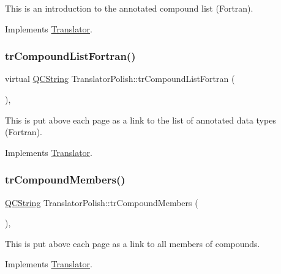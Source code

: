 This is an introduction to the annotated compound list (Fortran). 

Implements \mbox{\hyperlink{class_translator}{Translator}}.

\mbox{\label{class_translator_polish_a7c51709c279dfd97434d2ad5e0dc7ee9}} 
\subsubsection{\texorpdfstring{trCompoundListFortran()}{trCompoundListFortran()}}
{\footnotesize\ttfamily virtual \mbox{\hyperlink{class_q_c_string}{Q\+C\+String}} Translator\+Polish\+::tr\+Compound\+List\+Fortran (\begin{DoxyParamCaption}{ }\end{DoxyParamCaption})\hspace{0.3cm}{\ttfamily [inline]}, {\ttfamily [virtual]}}

This is put above each page as a link to the list of annotated data types (Fortran). 

Implements \mbox{\hyperlink{class_translator}{Translator}}.

\mbox{\label{class_translator_polish_ae99640a160ae514a3bfde7b92802d880}} 
\subsubsection{\texorpdfstring{trCompoundMembers()}{trCompoundMembers()}}
{\footnotesize\ttfamily \mbox{\hyperlink{class_q_c_string}{Q\+C\+String}} Translator\+Polish\+::tr\+Compound\+Members (\begin{DoxyParamCaption}{ }\end{DoxyParamCaption})\hspace{0.3cm}{\ttfamily [inline]}, {\ttfamily [virtual]}}

This is put above each page as a link to all members of compounds. 

Implements \mbox{\hyperlink{class_translator}{Translator}}.

\mbox{\label{class_translator_polish_a91e0ccb09917a94f318d03886db20f3c}} 
